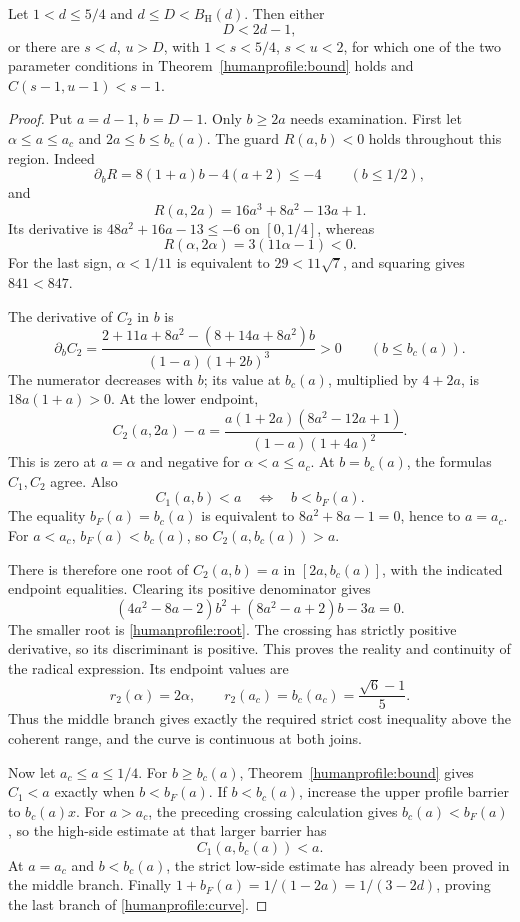 \begin{proposition}
\label{humanprofile:algebra}
Let \(1<d\le5/4\) and \(d\le D<B_{\mathrm H}(d)\).
Then either
\[
 D<2d-1,
\]
or there are \(s<d\), \(u>D\), with \(1<s<5/4\),
\(s<u<2\), for which one of the two parameter conditions in
Theorem~\ref{humanprofile:bound} holds and
\(C(s-1,u-1)<s-1\).
\end{proposition}
\begin{proof}
Put \(a=d-1\), \(b=D-1\). Only \(b\ge2a\) needs examination.
First let
\(\alpha\le a\le a_c\) and \(2a\le b\le b_c(a)\).
The guard \(R(a,b)<0\) holds throughout this region. Indeed
\[
 \partial_bR=8(1+a)b-4(a+2)\le-4\qquad(b\le1/2),
\]
and
\[
 R(a,2a)=16a^3+8a^2-13a+1.
\]
Its derivative is \(48a^2+16a-13\le-6\) on \([0,1/4]\),
whereas
\[
 R(\alpha,2\alpha)=3(11\alpha-1)<0.
\]
For the last sign, \(\alpha<1/11\) is equivalent to
\(29<11\sqrt7\), and squaring gives \(841<847\).

The derivative of \(C_2\) in \(b\) is
\[
 \partial_bC_2=
 \frac{2+11a+8a^2-(8+14a+8a^2)b}
      {(1-a)(1+2b)^3}>0
 \qquad(b\le b_c(a)).
\]
The numerator decreases with \(b\); its value at \(b_c(a)\),
multiplied by \(4+2a\), is \(18a(1+a)>0\).
At the lower endpoint,
\[
 C_2(a,2a)-a
 =\frac{a(1+2a)(8a^2-12a+1)}
        {(1-a)(1+4a)^2}.
\]
This is zero at \(a=\alpha\) and negative for
\(\alpha<a\le a_c\).
At \(b=b_c(a)\), the formulas \(C_1,C_2\) agree. Also
\[
 C_1(a,b)<a
 \quad\Longleftrightarrow\quad b<b_F(a).
\]
The equality \(b_F(a)=b_c(a)\) is equivalent to
\(8a^2+8a-1=0\), hence to \(a=a_c\).
For \(a<a_c\), \(b_F(a)<b_c(a)\), so
\(C_2(a,b_c(a))>a\).

There is therefore one root of \(C_2(a,b)=a\) in
\([2a,b_c(a)]\), with the indicated endpoint equalities.
Clearing its positive denominator gives
\[
 (4a^2-8a-2)b^2+(8a^2-a+2)b-3a=0.
\]
The smaller root is \eqref{humanprofile:root}. The crossing has
strictly positive derivative, so its discriminant is positive.
This proves the reality and continuity of the radical expression.
Its endpoint values are
\[
 r_2(\alpha)=2\alpha,\qquad
 r_2(a_c)=b_c(a_c)=\frac{\sqrt6-1}{5}.
\]
Thus the middle branch gives exactly the required strict cost
inequality above the coherent range, and the curve is continuous
at both joins.

Now let \(a_c\le a\le1/4\).
For \(b\ge b_c(a)\), Theorem~\ref{humanprofile:bound} gives
\(C_1<a\) exactly when \(b<b_F(a)\).
If \(b<b_c(a)\), increase the upper profile barrier to
\(b_c(a)x\). For \(a>a_c\), the preceding crossing calculation
gives \(b_c(a)<b_F(a)\), so the high-side estimate at that
larger barrier has
\[
 C_1(a,b_c(a))<a.
\]
At \(a=a_c\) and \(b<b_c(a)\), the strict low-side estimate
has already been proved in the middle branch.
Finally \(1+b_F(a)=1/(1-2a)=1/(3-2d)\), proving the last
branch of \eqref{humanprofile:curve}.


\end{proof}
